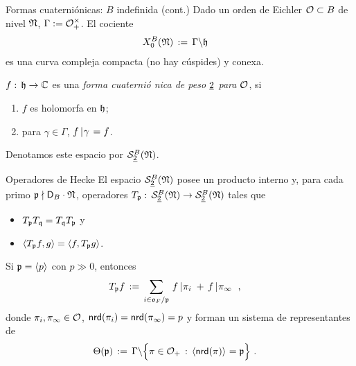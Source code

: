 \begin{frame}{Formas cuaterni\'{o}nicas: $B$ indefinida (cont.)}
	Dado un orden de Eichler $\cal O\subset B$ de nivel $\frak N$,
	$\Gamma:=\cal O_+^\times$. El cociente
	\begin{align*}
		X^B_0(\frak N) & \,:=\,\Gamma\backslash\hP
	\end{align*}
	es una curva compleja compacta (no hay c\'{u}spides) y conexa.

	\begin{defCuaternionicas}\label{def:cuaternionicasindef}
		$f:\,\hP\rightarrow\bb C$ es una \emph{forma cuaterni\'{o}%
		nica de peso $\peso 2$ para $\cal O$}, si
		\begin{enumerate}
			\item $f$ es holomorfa en $\hP$;
			\item para $\gamma\in\Gamma$,
				$f\operadormatrices{}{\gamma}=f$.
		\end{enumerate}
		Denotamos este espacio por $\spitzH[B]2{\frak N}$.
	\end{defCuaternionicas}
\end{frame}

\begin{frame}{Operadores de Hecke}
	El espacio $\spitzH[B]2{\frak N}$ posee un producto interno y, para
	cada primo $\frak p\nmid\disc[B]\cdot\frak N$, operadores
	$T_{\frak p}:\,\spitzH[B]2{\frak N}\rightarrow\spitzH[B]2{\frak N}$
	tales que
	\begin{itemize}
		\item $T_{\frak p}T_{\frak q}=T_{\frak q}T_{\frak p}$ y
		\item
			\begin{math}
				\langle T_{\frak p}f,g\rangle=
					\langle f,T_{\frak p}g\rangle
			\end{math}.
	\end{itemize}
	Si $\frak p=\generado p$ con $p\gg 0$, entonces
	\begin{align*}
		T_{\frak p}f & \,:=\,\sum_{i\in \oka F/\frak p}\,
			f\operadormatrices{}{\pi_i} \,+\,
			f\operadormatrices{}{\pi_\infty}
		\text{ ,}
	\end{align*}
	donde $\pi_i,\pi_\infty\in\cal O$, $\nrd(\pi_i)=\nrd(\pi_\infty)=p$ y
	forman un sistema de representantes de
	\begin{align*}
		\Theta(\frak p) & \,:=\,\Gamma\backslash\Big\{
			\pi\in\cal O_+\,:\,\generado{\nrd(\pi)}=\frak p\Big\}
		\text{ .}
	\end{align*}
\end{frame}


